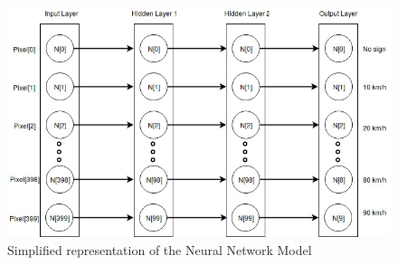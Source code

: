 \begin{figure}[H]
	\centering
	\includegraphics[width=0.9\linewidth]{images/neuralnetmodel.jpg}
	\caption{Simplified representation of the Neural Network Model }\label{fig:neuralnetmodel}	
\end{figure}
